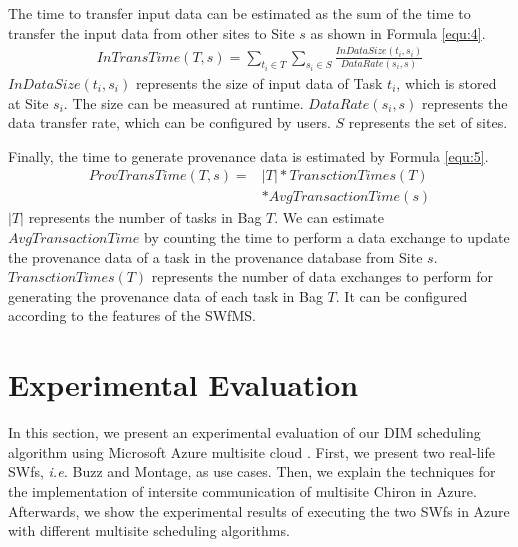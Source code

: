 The time to transfer input data can be estimated as the sum of the time to transfer the input data from other sites to Site $s$ as shown in Formula \ref{equ:4}.
\begin{equation}\label{equ:4}
\begin{split}
InTransTime( T, s ) = \sum_{t_i \in T}\sum_{s_i \in S}\frac{InDataSize( t_i, s_i )}{DataRate( s_i, s )}
\end{split}
\end{equation}
$InDataSize( t_i, s_i)$ represents the size of input data of Task $t_i$, which is stored at Site $s_i$. The size can be measured at runtime. $DataRate( s_i, s )$ represents the data transfer rate, which can be configured by users. $S$ represents the set of sites. 

Finally, the time to generate provenance data is estimated by Formula \ref{equ:5}.
\begin{equation}\label{equ:5}
\begin{split}
ProvTransTime( T, s ) = &|T| * TransctionTimes( T ) \\ & * AvgTransactionTime( s )
\end{split}
\end{equation}
$|T|$ represents the number of tasks in Bag $T$. We can estimate $AvgTransactionTime$ by counting the time to perform a data exchange to update the provenance data of a task in the provenance database from Site $s$. $TransctionTimes( T )$ represents the number of data exchanges to perform for generating the provenance data of each task in Bag $T$. It can be configured according to the features of the SWfMS.

\section{Experimental Evaluation}
\label{sec:FGVal}
In this section, we present an experimental evaluation of our DIM scheduling algorithm using Microsoft Azure multisite cloud \cite{Azure}. First, we present two real-life SWfs, \textit{i.e.} Buzz and Montage, as use cases. Then, we explain the techniques for the implementation of intersite communication of multisite Chiron in Azure. Afterwards, we show the experimental results of executing the two SWfs in Azure with different multisite scheduling algorithms.


